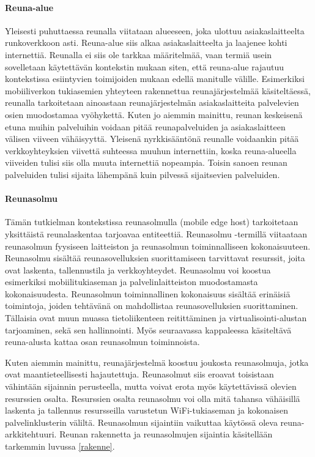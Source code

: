 \paragraph{Reuna-alue} 
Yleisesti puhuttaessa reunalla viitataan alueeseen, joka ulottuu asiakaslaitteelta runkoverkkoon asti. Reuna-alue siis alkaa asiakaslaitteelta ja laajenee kohti internettiä.
Reunalla ei siis ole tarkkaa määritelmää, vaan termiä usein sovelletaan käytettävän kontekstin mukaan siten, että reuna-alue rajautuu kontekstissa esiintyvien toimijoiden mukaan edellä manitulle välille.
Esimerkiksi mobiiliverkon tukiasemien yhteyteen rakennettua reunajärjestelmää käsiteltäessä, reunalla tarkoitetaan ainoastaan reunajärjestelmän asiakaslaitteita palvelevien osien muodostamaa vyöhykettä. 
Kuten jo aiemmin mainittu, reunan keskeisenä etuna muihin palveluihin voidaan pitää reunapalveluiden ja asiakaslaitteen välisen viiveen vähäisyyttä.
Yleisenä nyrkkisääntönä reunalle voidaankin pitää verkkoyhteyksien viivettä suhteessa muuhun internettiin, koska reuna-alueella viiveiden tulisi siis olla muuta internettiä nopeampia. Toisin sanoen reunan palveluiden tulisi sijaita lähempänä kuin pilvessä sijaitsevien palveluiden.


\paragraph{Reunasolmu} 
Tämän tutkielman kontekstissa reunasolmulla (mobile edge host) tarkoitetaan yksittäistä reunalaskentaa tarjoavaa entiteettiä\cite{etsirefarch}.
Reunasolmu -termillä viitaataan reunasolmun fyysiseen laitteiston ja reunasolmun toiminnalliseen kokonaisuuteen.
Reunasolmu sisältää reunasovelluksien suorittamiseen tarvittavat resurssit, joita ovat laskenta, tallennustila ja verkkoyhteydet.
Reunasolmu voi koostua esimerkiksi mobiilitukiaseman ja palvelinlaitteiston muodostamasta kokonaisuudesta. 
Reunasolmun toiminnallinen kokonaisuus sisältää erinäisiä toimintoja, joiden tehtävänä on mahdollistaa reunasovelluksien suorittaminen. Tällaisia ovat muun muassa tietoliikenteen reitittäminen ja virtualisointi-alustan tarjoaminen, sekä sen hallinnointi. Myös seuraavassa kappaleessa käsiteltävä reuna-alusta kattaa osan reunasolmun toiminnoista.

Kuten aiemmin mainittu, reunajärjestelmä koostuu joukosta reunasolmuja, jotka ovat maantieteellisesti hajautettuja.
Reunasolmut siis eroavat toisistaan vähintään sijainnin perusteella, mutta voivat erota myös käytettävissä olevien resurssien osalta. Resurssien osalta reunasolmu voi olla mitä tahansa vähäisillä laskenta ja tallennus resursseilla varustetun WiFi-tukiaseman ja kokonaisen palvelinklusterin väliltä.
Reunasolmun sijaintiin vaikuttaa käytössä oleva reuna-arkkitehtuuri.
Reunan rakennetta ja  reunasolmujen sijaintia käsitellään tarkemmin luvussa \ref{rakenne}.

